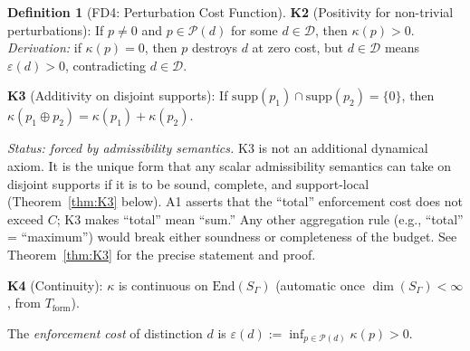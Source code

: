 \documentclass[11pt,a4paper]{article}
\theoremstyle{definition}
\newtheorem{definition}[theorem]{Definition}
\newcommand{\eps}{\varepsilon}
\newcommand{\End}{\mathrm{End}}
\begin{document}
\begin{definition}[FD4: Perturbation Cost Function]
\smallskip\noindent
\textbf{K2} (Positivity for non-trivial perturbations): If $p \ne 0$ and $p \in \mathcal{P}(d)$ for some $d \in \mathcal{D}$, then $\kappa(p) > 0$.  \textit{Derivation:} if $\kappa(p) = 0$, then $p$ destroys $d$ at zero cost, but $d \in \mathcal{D}$ means $\eps(d) > 0$, contradicting $d \in \mathcal{D}$.

\smallskip\noindent
\textbf{K3} (Additivity on disjoint supports): If $\mathrm{supp}(p_1) \cap \mathrm{supp}(p_2) = \{0\}$, then $\kappa(p_1 \oplus p_2) = \kappa(p_1) + \kappa(p_2)$.

\noindent\textit{Status: forced by admissibility semantics.}  K3 is not an additional dynamical axiom.  It is the unique form that any scalar admissibility semantics can take on disjoint supports if it is to be sound, complete, and support-local (Theorem~\ref{thm:K3} below).  A1 asserts that the ``total'' enforcement cost does not exceed $C$; K3 makes ``total'' mean ``sum.''  Any other aggregation rule (e.g., ``total'' = ``maximum'') would break either soundness or completeness of the budget.  See Theorem~\ref{thm:K3} for the precise statement and proof.

\smallskip\noindent
\textbf{K4} (Continuity): $\kappa$ is continuous on $\End(S_\Gamma)$ (automatic once $\dim(S_\Gamma) < \infty$, from $T_{\mathrm{form}}$).

\smallskip\noindent
The \emph{enforcement cost} of distinction $d$ is $\eps(d) := \inf_{p \in \mathcal{P}(d)} \kappa(p) > 0$.
\end{definition}
\end{document}
